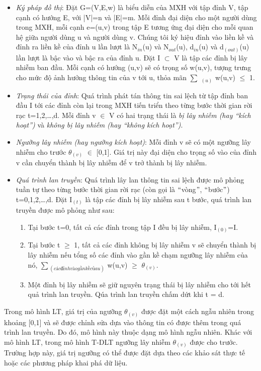  		\begin {itemize}
 			\item {\itshape Ký pháp đồ thị}: Đặt G=(V,E,w) là biểu diễn của MXH với tập đỉnh V, tập cạnh có hướng E, với |V|=n và |E|=m. Mỗi đỉnh đại diện cho một người dùng trong MXH, mỗi cạnh e=(u,v) trong tập E tương ứng đại diện cho mỗi quan hệ giữa người dùng u và người dùng v. Chúng tôi ký hiệu đỉnh vào liền kề và đỉnh ra liền kề của đỉnh u lần lượt là N$_{in}$(u) và N$_{out}$(u), d$_{in}$(u) và d$_(out)$(u) lần lượt là bậc vào và bậc ra của đỉnh u. Đặt I $\subset$ V là tập các đỉnh bị lây nhiễm ban đầu. Mỗi cạnh có hướng (u,v) sẽ có trọng số w(u,v), tượng trưng cho mức độ ảnh hưởng thông tin của v tới u, thỏa mãn $\sum$ $_(u)$ w(u,v) $\leq$ 1.
 		
 			\item {\itshape Trạng thái của đỉnh}: Quá trình phát tán thông tin sai lệch từ tập đỉnh ban đầu I tới các đỉnh còn lại trong MXH tiến triển theo từng bước thời gian rời rạc t=1,2,…,d. Mỗi đỉnh v $\in$ V có hai trạng thái là {\itshape bị lây nhiễm (hay “kích hoạt”)} và {\itshape không bị lây nhiễm (hay “không kích hoạt”)}.
 		
 			\item {\itshape Ngưỡng lây nhiễm (hay ngưỡng kích hoạt)}: Mỗi đỉnh v sẽ có một ngưỡng lây nhiễm cho trước $\theta$$_(v)$ $\in$ [0,1]. Giá trị này đại diện cho trọng số vào của đỉnh v cần chuyển thành bị lây nhiễm để v trở thành bị lây nhiễm.
 		
 			\item {\itshape Quá trình lan truyền}: Quá trình lây lan thông tin sai lệch được mô phỏng tuần tự theo từng bước thời gian rời rạc (còn gọi là $``$vòng$"$, $``$bước$"$) t=0,1,2,…,d. Đặt I$_(t)$ là tập các đỉnh bị lây nhiễm sau t bước, quá trình lan truyền được mô phỏng như sau:
 			\begin {enumerate} [+]
 				\item Tại bước t=0, tất cả các đỉnh trong tập I đều bị lây nhiễm, I$_(0)$=I.
 		
 				\item Tại bước t $\geq$ 1, tất cả các đỉnh không bị lây nhiễm v sẽ chuyển thành bị lây nhiễm nếu tổng số các đỉnh vào gần kề chạm ngưỡng lây nhiễm của nó, $\sum$$_(các đỉnh vào gần kề của u)$ w(u,v) $\geq$ $\theta$$_(v)$.	
 		
 				\item Một đỉnh bị lây nhiễm sẽ giữ nguyên trạng thái bị lây nhiễm cho tới hết quả trình lan truyền. Qúa trình lan truyền chấm dứt khi t = d.
 			\end {enumerate}
 		\end {itemize}
 		Trong mô hình LT, giá trị của ngưỡng $\theta$$_(v)$ được đặt một cách ngẫu nhiên trong khoảng [0,1] và sẽ được chỉnh sửa dựa vào thông tin có được thêm trong quá trình lan truyền. Do đó, mô hình này thuộc dạng mô hình ngẫu nhiên. Khác với mô hình LT, trong mô hình T-DLT ngưỡng lây nhiễm $\theta$$_(v)$ được cho trước. Trường hợp này, giá trị ngưỡng có thể được đặt dựa theo các khảo sát thực tế hoặc các phương pháp khai phá dữ liệu.
 		
